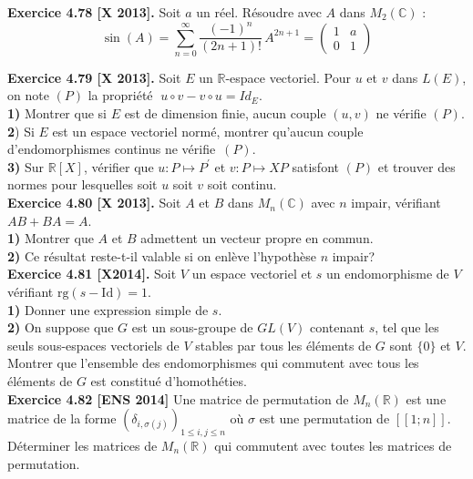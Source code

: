 \documentclass[a4paper,12pt,francais]{article}
\newcommand{\field}[1]{\mathbb{#1}}
\newcommand{\R}{\field{R}}
\newcommand{\C}{\field{C}}
\newcommand{\id}{\mbox{Id}}
\newcommand{\rg}{\mbox{rg}}
\begin{document}
\noindent
{\bf Exercice 4.78 [X 2013].} Soit $a$ un réel. Résoudre avec $A$ dans $M_2(\C)$ :\\
$$\sin(A) = \sum_{n=0}^\infty \frac{(-1)^n}{(2n+1)!} \, A^{2n+1} = 
\left({
\begin{array}{cc}
1&a\\
0&1
\end{array}
}\right)$$

\noindent
{\bf Exercice 4.79 [X 2013].} Soit $E$ un $\R$-espace vectoriel. 
Pour $u$ et $v$ dans $L(E)$, on note $(P)$
la propriété $\; u\circ v-v \circ u = Id_E$.\\
{\bf 1)} Montrer que si $E$ est de dimension finie, aucun couple $(u, v)$ ne vérifie $(P )$.\\
{\bf 2}) Si $E$ est un espace vectoriel normé, montrer qu'aucun couple d'endomorphismes continus ne vérifie~$(P )$.\\
{\bf 3)} Sur $\R[X]$, vérifier que $u : P \mapsto P^\prime$ et $v : P \mapsto XP$ satisfont $(P)$ et trouver des normes pour lesquelles soit $u$ soit $v$ soit continu.\\

\noindent
{\bf Exercice 4.80 [X 2013].} Soit $A$ et $B$ dans $M_n(\C)$ avec $n$ impair, vérifiant $AB+BA=A$.\\
{\bf 1)} Montrer que $A$ et $B$ admettent un vecteur propre en commun.\\
{\bf 2)} Ce résultat reste-t-il valable si on enlève l'hypothèse $n$ impair?\\

\noindent
{\bf Exercice 4.81 [X2014].} Soit $V$ un espace vectoriel et $s$ un endomorphisme de $V$ vérifiant $\rg(s-\id)=1$.\\
{\bf 1)} Donner une expression simple de $s$.\\
{\bf 2)} On suppose que $G$ est un sous-groupe de $GL(V)$ contenant $s$, tel que les seuls sous-espaces vectoriels de $V$ stables par tous les éléments de $G$ sont $\{0\}$ et $V$. Montrer que l'ensemble des endomorphismes qui commutent avec tous les éléments de $G$ est constitué d'homothéties.\\

\noindent
{\bf Exercice 4.82 [ENS 2014]} Une matrice de permutation de $M_n(\R)$ est une matrice de la forme $(\delta_{i,\sigma(j)})_{1 \leqslant i,j \leqslant n}$ où $\sigma$ est une permutation de $[\![1;n]\!]$. Déterminer les matrices de $M_n(\R)$ qui commutent avec toutes les matrices de permutation.\\
\end{document}
